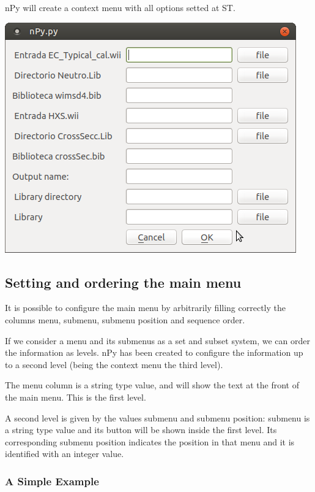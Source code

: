 \documentclass[a4paper,10pt]{article}
\begin{document}
nPy will create a context menu with all options setted at ST.

\begin{center}
 \includegraphics[width=\textwidth]{img/orderingSequenceContextMenu.png}
\end{center}

\subsection{Setting and ordering the main menu}

It is possible to configure the main menu by arbitrarily filling correctly the columns menu, submenu, submenu position and sequence order.

If we consider a menu and its submenus as a set and subset system, we can order the information as levels. nPy has been created to configure the information up to a second level (being the context menu the third level).

The menu column is a string type value, and will show the text at the front of the main menu. This is the first level.

A second level is given by the values submenu and submenu position: submenu is a string type value and its button will be shown inside the first level. Its corresponding submenu position indicates the position in that menu and it is identified with an integer value.

\subsubsection{A Simple Example}
\end{document}
